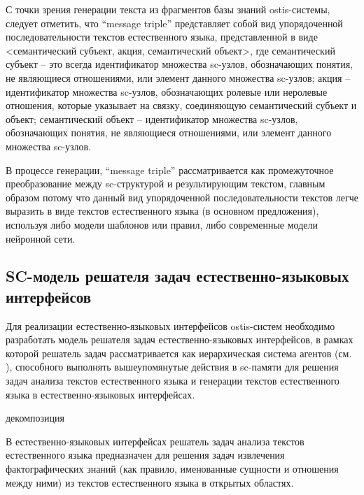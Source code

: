 С точки зрения генерации текста из фрагментов базы знаний ostis-системы, следует отметить, что ``message triple'' представляет собой вид упорядоченной последовательности текстов естественного языка, представленной в виде <семантический субъект, акция, семантический объект>, где семантический субъект -- это всегда идентификатор множества sc-узлов, обозначающих понятия, не являющиеся отношениями, или элемент данного множества sc-узлов; акция -- идентификатор множества sc-узлов, обозначающих ролевые или неролевые отношения, которые указывает на связку, соединяющую семантический субъект и объект; семантический объект -- идентификатор множества sc-узлов, обозначающих понятия, не являющиеся отношениями, или элемент данного множества sc-узлов.

В процессе генерации, ``message triple'' рассматривается как промежуточное преобразование между sc-структурой и результирующим текстом, главным образом потому что данный вид упорядоченной последовательности текстов легче выразить в виде текстов естественного языка (в основном предложения), используя либо модели шаблонов или правил, либо современные модели нейронной сети. 

\subsection{SC-модель решателя задач естественно-языковых интерфейсов}
Для реализации естественно-языковых интерфейсов ostis-систем необходимо разработать модель решателя задач естественно-языковых интерфейсов, в рамках которой решатель задач рассматривается как иерархическая система агентов (см. ), способного выполнять вышеупомянутые действия в sc-памяти для решения задач анализа текстов естественного языка и генерации текстов естественного языка в естественно-языковых интерфейсах.
\begin{SCn}
	\begin{scnrelfromset}{декомпозиция}
	\end{scnrelfromset}
\end{SCn}

В естественно-языковых интерфейсах решатель задач анализа текстов естественного языка предназначен для решения задач извлечения фактографических знаний (как правило, именованные сущности и отношения между ними) из текстов естественного языка в открытых областях.

